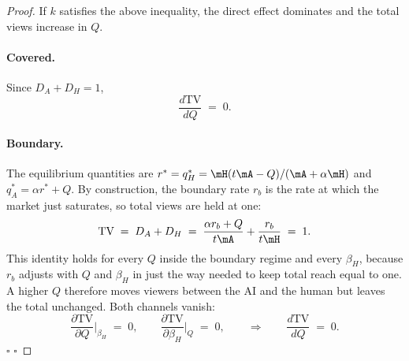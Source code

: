 \begin{proof}
If $k$ satisfies the above inequality, the direct effect dominates and the total views increase in $Q$.

\paragraph{Covered.}
Since $D_A + D_H = 1$,
\[
\frac{d \text{TV}}{d Q}\;=\; 0.
\]

\paragraph{Boundary.}
The equilibrium quantities are $r^* = q_H^* = \mH(t\mA-Q)/(\mA+\alpha\mH)$
and $q_A^* = \alpha r^* + Q$. By construction, the boundary rate $r_b$ is the
rate at which the market just saturates, so total views are held at one:
\[
\text{TV} \;=\; D_A + D_H
\;=\; \frac{\alpha r_b + Q}{t\mA} + \frac{r_b}{t\mH}
\;=\; 1.
\]
This identity holds for every $Q$ inside the boundary regime and every
$\beta_H$, because $r_b$ adjusts with $Q$ and $\beta_H$ in just the way needed
to keep total reach equal to one. A higher $Q$ therefore moves viewers between
the AI and the human but leaves the total unchanged. Both channels vanish:
\[
\frac{\partial \text{TV}}{\partial Q}\bigg|_{\beta_H} \;=\; 0,
\qquad
\frac{\partial \text{TV}}{\partial \beta_H}\bigg|_{Q} \;=\; 0,
\qquad\Longrightarrow\qquad
\frac{d\text{TV}}{dQ} \;=\; 0.
\]
\hfill $\square$
\hfill $\square$
\end{proof}

